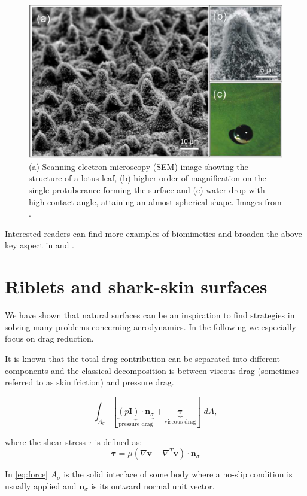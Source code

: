 \begin{figure}[h]
	\centering
	\includegraphics[width=0.6\linewidth]{chapter_1/lotus}
	\caption{(a) Scanning electron microscopy (SEM) image showing the structure of a lotus leaf, (b) higher order of magnification on the single protuberance forming the surface and (c) water drop with high contact angle, attaining an almost spherical shape. Images from \citet{stratakis2009laser}.}
	\label{fig:lotus}
\end{figure}

Interested readers can find more examples of biomimetics and broaden the above key aspect in \citet{bhushan2016biomimetics} and \citet{tropea2012nature}.

\section{Riblets and shark-skin surfaces}
We have shown that natural surfaces can be an inspiration to find strategies in solving many problems concerning aerodynamics. In the following we especially focus on drag reduction.

It is known that the total drag contribution can be separated into different components and the classical decomposition is between viscous drag (sometimes referred to as skin friction) and pressure drag.

\begin{equation}
 \int_{A_{\sigma}}  [ \underbrace{\left({p} \mathbf{I} \right) \cdot  \mathbf{n}_{\sigma} }_\text{pressure drag}  +  \underbrace{\boldsymbol{\tau}}_\text{viscous drag} ] \; dA,
 \label{eq:force}
\end{equation}

\noindent where the shear stress $\tau$ is defined as:
$$
\boldsymbol{\tau} = \mu \left( \nabla \mathbf{v} +  \nabla^T \mathbf{v} \right) \cdot  \mathbf{n}_{\sigma}
$$

\noindent In \eqref{eq:force} $A_{\sigma}$ is the solid interface of some body where a no-slip condition is usually applied and $ \mathbf{n}_{\sigma}$ is its outward normal unit vector.

